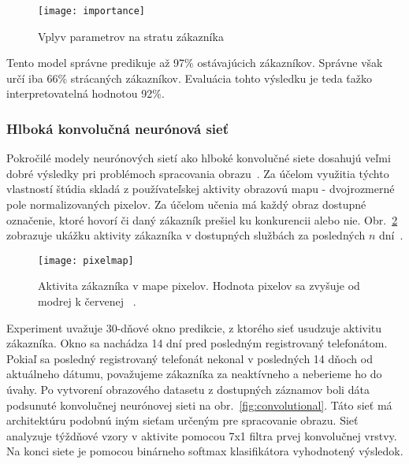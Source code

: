 \begin{figure}[H]
\begin{center}
\texttt{[image: importance]}\end{center}
\caption[importance]{Vplyv parametrov na stratu zákazníka~\cite{sharma2013neural}}
\label{fig:importance}
\end{figure}

Tento model správne predikuje až 97\% ostávajúcich zákazníkov. Správne však určí iba 66\% strácaných zákazníkov. Evaluácia tohto výsledku je teda ťažko interpretovatelná hodnotou 92\%. 

\subsubsection{Hlboká konvolučná neurónová sieť}
\label{metoda_konvolucna}


Pokročilé modely neurónových sietí ako hlboké konvolučné siete dosahujú veľmi dobré výsledky pri problémoch spracovania obrazu~\cite{szegedy2015going}.
Za účelom využitia týchto vlastností štúdia skladá z používateľskej aktivity obrazovú mapu - dvojrozmerné pole normalizovaných pixelov. Za účelom učenia má každý obraz dostupné označenie, ktoré hovorí či daný zákazník prešiel ku konkurencii alebo nie. Obr.~\ref{fig:pixelmap} zobrazuje ukážku aktivity zákazníka v dostupných službách za posledných $n$ dní~\cite{wangperawong2016churn}.

\begin{figure}[H]
\begin{center}
\texttt{[image: pixelmap]}\end{center}
\caption[pixelmap]{Aktivita zákazníka v mape pixelov. Hodnota pixelov sa zvyšuje od modrej k červenej
~\cite{wangperawong2016churn}.}
\label{fig:pixelmap}
\end{figure}

Experiment uvažuje 30-dňové okno predikcie, z ktorého sieť usudzuje aktivitu zákazníka. Okno sa nachádza 14 dní pred posledným registrovaný telefonátom. Pokiaľ sa posledný registrovaný telefonát nekonal v posledných 14 dňoch od aktuálneho dátumu, považujeme zákazníka za neaktívneho a neberieme ho do úvahy.
\newline
Po vytvorení obrazového datasetu z dostupných záznamov boli dáta podsunuté konvolučnej neurónovej sieti na obr.~\ref{fig:convolutional}.
Táto sieť má architektúru podobnú iným sieťam určeným pre spracovanie obrazu. Sieť analyzuje týždňové vzory v aktivite pomocou 7x1 filtra prvej konvolučnej vrstvy. Na konci siete je pomocou binárneho softmax klasifikátora vyhodnotený výsledok.
\newline

